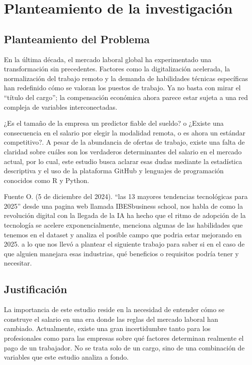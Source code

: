 \documentclass[oneside,11pt]{Latex/Classes/PhDthesisPSnPDF}
\begin{document}
\chapter{Planteamiento de la investigación}

\section{Planteamiento del Problema}

En la última década, el mercado laboral global ha experimentado una
transformación sin precedentes. Factores como la digitalización
acelerada, la normalización del trabajo remoto y la demanda de
habilidades técnicas específicas han redefinido cómo se valoran los
puestos de trabajo. Ya no basta con mirar el ``título del cargo''; la
compensación económica ahora parece estar sujeta a una red compleja de
variables interconectadas.

¿Es el tamaño de la empresa un predictor fiable del sueldo? o ¿Existe
una consecuencia en el salario por elegir la modalidad remota, o es
ahora un estándar competitivo?. A pesar de la abundancia de ofertas de
trabajo, existe una falta de claridad sobre cuáles son los verdaderos
determinantes del salario en el mercado actual, por lo cual, este
estudio busca aclarar esas dudas mediante la estadística descriptiva y
el uso de la plataforma GitHub y lenguajes de programación conocidos
como R y Python.

Fuente O. (5 de diciembre del 2024). ``las 13 mayores tendencias
tecnológicas para 2025'' desde una pagina web llamada IBESbusiness
school, nos habla de como la revolución digital con la llegada de la IA
ha hecho que el ritmo de adopción de la tecnología se acelere
exponencialmente, menciona algunas de las habilidades que tenemos en el
dataset y analiza el posible campo que podria estar mejorando en 2025. a
lo que nos llevó a plantear el siguiente trabajo para saber si en el
caso de que alguien manejara esas industrias, qué beneficios o
requisitos podría tener y necesitar.

\section{Justificación}

La importancia de este estudio reside en la necesidad de entender cómo
se construye el salario en una era donde las reglas del mercado laboral
han cambiado. Actualmente, existe una gran incertidumbre tanto para los
profesionales como para las empresas sobre qué factores determinan
realmente el pago de un trabajador. No se trata solo de un cargo, sino
de una combinación de variables que este estudio analiza a fondo.
\end{document}
